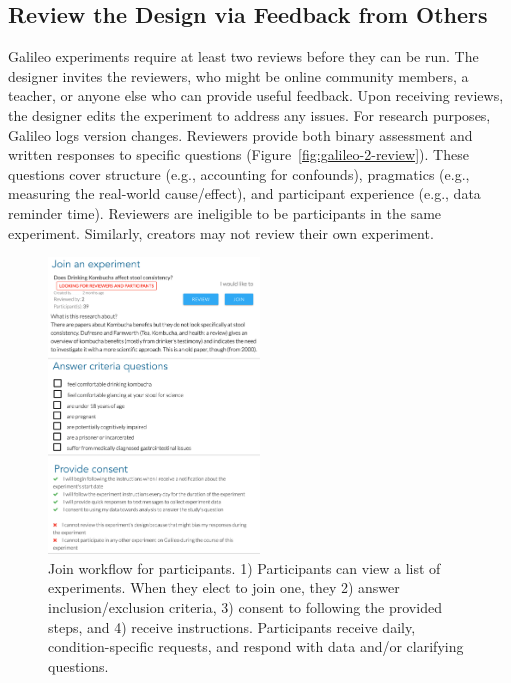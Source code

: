 \subsection{Review the Design via Feedback from Others}
Galileo experiments require at least two reviews before they can be run. The designer invites the reviewers, who might be online community members, a teacher, or anyone else who can provide useful feedback. Upon receiving reviews, the designer edits the experiment to address any issues. For research purposes, Galileo logs version changes. Reviewers provide both binary assessment and written responses to specific questions (Figure~\ref{fig:galileo-2-review}). These questions cover structure (e.g., accounting for confounds), pragmatics (e.g., measuring the real-world cause/effect), and participant experience (e.g., data reminder time). Reviewers are ineligible to be participants in the same experiment. Similarly, creators may not review their own experiment. 

\begin{figure}
  \centering
  \includegraphics[width=0.5\textwidth]{figures/galileo/galileo-2-run}
  \caption[Join workflow for participants]
{Join workflow for participants. 1) Participants can view a list of experiments. When they elect to join one, they 2) answer inclusion/exclusion criteria, 3) consent to following the provided steps, and 4) receive instructions. Participants receive daily, condition-specific requests, and respond with data and/or clarifying questions. }
  \label{fig:galileo-2-run}
\end{figure}

